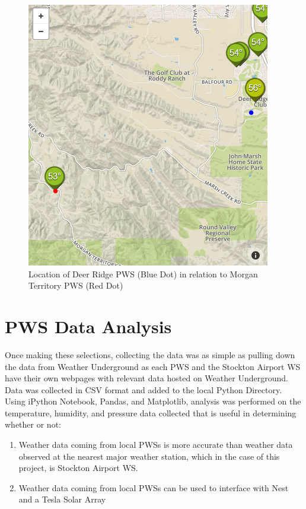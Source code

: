 \documentclass[sigconf]{acmart}
\begin{document}
\begin{figure}[H]
    \centering
    \includegraphics[width=\columnwidth]{images/DR_MTP.PNG}
    \caption{Location of Deer Ridge PWS (Blue Dot) in relation to Morgan Territory PWS (Red Dot)}
    \end{figure}

\section{PWS Data Analysis}

Once making these selections, collecting the data was as simple as pulling down the data from Weather Underground as each PWS and the Stockton Airport WS have their own webpages with relevant data hosted on Weather Underground.\cite{WundergroundDeerRidge2017} Data was collected in CSV format and added to the local Python Directory. Using iPython Notebook, Pandas, and Matplotlib, analysis was performed on the temperature, humidity, and pressure data collected that is useful in determining whether or not:

\begin{enumerate}
    \item Weather data coming from local PWSs is more accurate than weather data observed at the nearest major weather station, which in the case of this project, is Stockton Airport WS.
    \item Weather data coming from local PWSs can be used to interface with Nest and a Tesla Solar Array
\end{enumerate}
\end{document}
